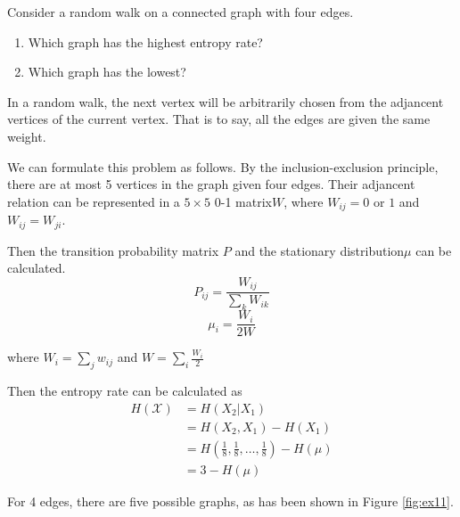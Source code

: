 \begin{exercise}{Consider a random walk on a connected graph with four edges.
  \begin{enumerate}
    \item Which graph has the highest entropy rate?
    \item Which graph has the lowest?
  \end{enumerate}}
  \begin{solution} In a random walk, the next vertex will be arbitrarily chosen from the adjancent vertices of the current vertex. That is to say, all the edges are given the same weight.

    We can formulate this problem as follows. By the inclusion-exclusion principle, there are at most 5 vertices in the graph given four edges. Their adjancent relation can be represented in a $5\times 5$ 0-1 matrix$W$, where $W_{i j} = 0$ or $1$ and $W_{i j}=W_{j i}$.

    Then the transition probability matrix $P$ and the stationary distribution$\mu$ can be calculated.
    \begin{equation}P_{i j}=\frac{W_{i j}} {\sum_{k} W_{i k}}
    \label{trans}\end{equation}
    \begin{equation}\mu_{i}=\frac{W_{i}}{2 W}\label{mu}\end{equation}

      where $W_{i}=\sum_{j} w_{i j}$ and $W=\sum_{i} \frac{W_{i}}{2}$
  
      Then the entropy rate can be calculated as
      \begin{equation}\begin{aligned}
        H(\mathcal{X})&=H\left(X_{2} | X_{1}\right) \\
        &= H(X_2,X_1) - H(X_1)\\
        &= H(\frac{1}{8},\frac{1}{8},\ldots,\frac{1}{8}) - H(\mu) \\
        &= 3 - H(\mu)
      \end{aligned}\end{equation}
      
      For 4 edges, there are five possible graphs, as has been shown in Figure \ref{fig:ex11}.


\end{solution}
\end{exercise}
